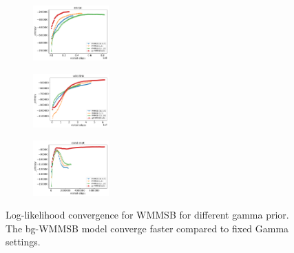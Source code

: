 
\begin{figure}[h]
\centering
    \begin{subfigure}
       	 \centering
        	 \includegraphics[width=0.32\textwidth]{warm2/enron_fig__entropy}
    \end{subfigure}
    \begin{subfigure}
        	 \centering
          \includegraphics[width=0.32\textwidth]{warm2/wiki-link_fig__entropy}
    \end{subfigure}
    \begin{subfigure}
        	 \centering
          \includegraphics[width=0.32\textwidth]{warm2/cond-mat_fig__entropy}
    \end{subfigure}
    \caption{Log-likelihood convergence for WMMSB for different gamma prior. The bg-WMMSB model converge faster compared to fixed Gamma settings.}
    \label{fig:conv_entropy}
\end{figure}
